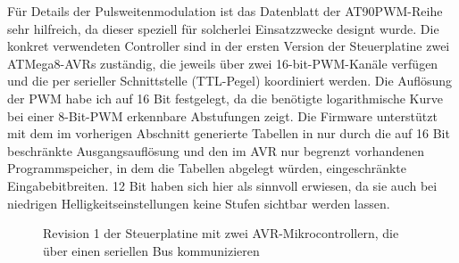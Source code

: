 \documentclass[12pt,a4paper,notitlepage]{article}
\begin{document}
Für Details der Pulsweitenmodulation ist das Datenblatt der AT90PWM-Reihe sehr hilfreich, da dieser speziell für solcherlei Einsatzzwecke designt wurde\cite{ATMEL2}. Die konkret verwendeten Controller sind in der ersten Version der Steuerplatine zwei ATMega8-AVRs zuständig, die jeweils über zwei 16-bit-PWM-Kanäle verfügen und die per serieller Schnittstelle (TTL-Pegel) koordiniert werden. Die Auflösung der PWM habe ich auf 16 Bit festgelegt, da die benötigte logarithmische Kurve bei einer 8-Bit-PWM erkennbare Abstufungen zeigt. Die Firmware unterstützt mit dem im vorherigen Abschnitt %
generierte Tabellen in nur durch die auf 16 Bit beschränkte Ausgangsauflösung und den im AVR nur begrenzt vorhandenen Programmspeicher, in dem die Tabellen abgelegt würden, eingeschränkte Eingabebitbreiten. 12 Bit haben sich hier als sinnvoll erwiesen, da sie auch bei %
niedrigen Helligkeitseinstellungen keine Stufen sichtbar werden lassen.

\begin{figure}
\centering
{}
\label{controller_rev1}
\caption{Revision 1 der Steuerplatine mit zwei AVR-Mikrocontrollern, die über einen seriellen Bus kommunizieren}
\end{figure}
\end{document}
